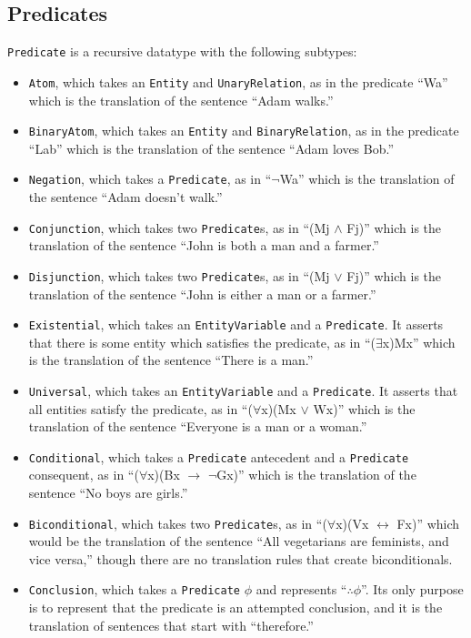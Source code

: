 \documentclass[a4paper, 11pt]{article}
\begin{document}
\subsection{Predicates}
\texttt{Predicate} is a recursive datatype with the following subtypes:
\begin{itemize}
	\item \texttt{Atom}, which takes an \texttt{Entity} and \texttt{UnaryRelation}, as in the predicate ``Wa'' which is the translation of the sentence ``Adam walks.''
	\item \texttt{BinaryAtom}, which takes an \texttt{Entity} and \texttt{BinaryRelation}, as in the predicate ``Lab'' which is the translation of the sentence ``Adam loves Bob.''
	\item \texttt{Negation}, which takes a \texttt{Predicate}, as in ``$\neg$Wa'' which is the translation of the sentence ``Adam doesn't walk.''
	\item \texttt{Conjunction}, which takes two \texttt{Predicate}s, as in ``(Mj $\wedge$ Fj)'' which is the translation of the sentence ``John is both a man and a farmer.''
	\item \texttt{Disjunction}, which takes two \texttt{Predicate}s, as in ``(Mj $\vee$ Fj)'' which is the translation of the sentence ``John is either a man or a farmer.''
	\item \texttt{Existential}, which takes an \texttt{EntityVariable} and a \texttt{Predicate}. It asserts that there is some entity which satisfies the predicate, as in ``($\exists$x)Mx'' which is the translation of the sentence ``There is a man.''
	\item \texttt{Universal}, which takes an \texttt{EntityVariable} and a \texttt{Predicate}. It asserts that all entities satisfy the predicate, as in ``($\forall$x)(Mx $\vee$ Wx)'' which is the translation of the sentence ``Everyone is a man or a woman.''
	\item \texttt{Conditional}, which takes a \texttt{Predicate} antecedent and a \texttt{Predicate} consequent, as in ``($\forall$x)(Bx $\rightarrow$ $\neg$Gx)'' which is the translation of the sentence ``No boys are girls.''
	\item \texttt{Biconditional}, which takes two \texttt{Predicate}s, as in ``($\forall$x)(Vx $\leftrightarrow$ Fx)'' which would be the translation of the sentence ``All vegetarians are feminists, and vice versa,'' though there are no translation rules that create biconditionals.
    \item \texttt{Conclusion}, which takes a \texttt{Predicate} $\phi$ and represents ``$\therefore \phi$''. Its only purpose is to represent that the predicate is an attempted conclusion, and it is the translation of sentences that start with ``therefore.''
\end{itemize}
\end{document}
